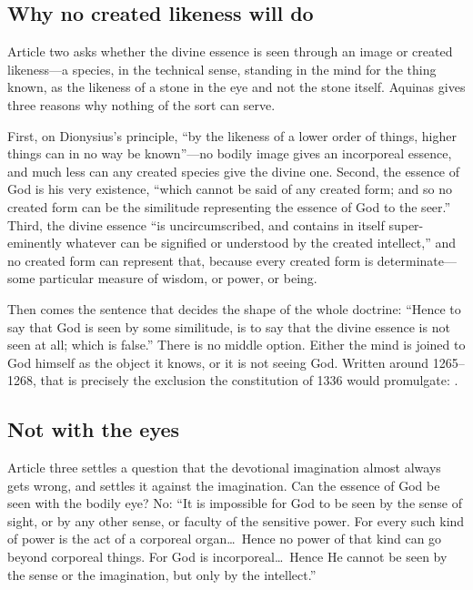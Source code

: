 \subsection{Why no created likeness will do}

Article two asks whether the divine essence is seen through an image or created likeness---a species, in the technical sense, standing in the mind for the thing known, as the likeness of a stone in the eye and not the stone itself. Aquinas gives three reasons why nothing of the sort can serve.

First, on Dionysius's principle, ``by the likeness of a lower order of things, higher things can in no way be known''---no bodily image gives an incorporeal essence, and much less can any created species give the divine one. Second, the essence of God is his very existence, ``which cannot be said of any created form; and so no created form can be the similitude representing the essence of God to the seer.'' Third, the divine essence ``is uncircumscribed, and contains in itself super-eminently whatever can be signified or understood by the created intellect,'' and no created form can represent that, because every created form is determinate---some particular measure of wisdom, or power, or being.

Then comes the sentence that decides the shape of the whole doctrine: ``Hence to say that God is seen by some similitude, is to say that the divine essence is not seen at all; which is false.'' There is no middle option. Either the mind is joined to God himself as the object it knows, or it is not seeing God. Written around 1265--1268, that is precisely the exclusion the constitution of 1336 would promulgate: .

\subsection{Not with the eyes}

Article three settles a question that the devotional imagination almost always gets wrong, and settles it against the imagination. Can the essence of God be seen with the bodily eye? No: ``It is impossible for God to be seen by the sense of sight, or by any other sense, or faculty of the sensitive power. For every such kind of power is the act of a corporeal organ\ldots\ Hence no power of that kind can go beyond corporeal things. For God is incorporeal\ldots\ Hence He cannot be seen by the sense or the imagination, but only by the intellect.''

